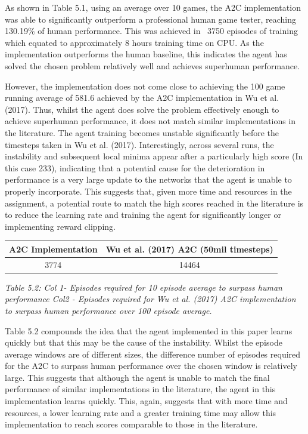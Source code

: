 \documentclass{article}
\begin{document}
As shown in Table 5.1, using an average over 10 games, the A2C implementation was able to significantly outperform a professional human game tester, reaching 130.19\% of human performance. This was achieved in ~3750 episodes of training which equated to approximately 8 hours training time on CPU. As the implementation outperforms the human baseline, this indicates the agent has solved the chosen problem relatively well and achieves superhuman performance. 

However, the implementation does not come close to achieving the 100 game running average of 581.6 achieved by the A2C implementation in Wu et al. (2017). Thus, whilst the agent does solve the problem effectively enough to achieve superhuman performance, it does not match similar implementations in the literature. The agent training becomes unstable significantly before the timesteps taken in Wu et al. (2017). Interestingly, across several runs, the instability and subsequent local minima appear after a particularly high score (In this case 233), indicating that a potential cause for the deterioration in performance is a very large update to the networks that the agent is unable to properly incorporate. This suggests that, given more time and resources in the assignment, a potential route to match the high scores reached in the literature is to reduce the learning rate and training the agent for significantly longer or implementing reward clipping.

\begin{table}[h!]
\centering
\begin{tabular}{|c | c|} 
 \hline
 A2C Implementation & Wu et al. (2017) A2C (50mil timesteps) \\ [0.5ex] 
 \hline
 3774 & 14464   \\ 
 \hline
\end{tabular}
\end{table}
\emph{Table 5.2: Col 1- Episodes required for 10 episode average to surpass human performance Col2 - Episodes required for Wu et al. (2017) A2C implementation to surpass human performance over 100 episode average.}

Table 5.2 compounds the idea that the agent implemented in this paper learns quickly but that this may be the cause of the instability. Whilst the episode average windows are of different sizes, the difference number of episodes required for the A2C to surpass human performance over the chosen window is relatively large. This suggests that although the agent is unable to match the final performance of similar implementations in the literature, the agent in this implementation learns quickly. This, again, suggests that with more time and resources, a lower learning rate and a greater training time may allow this implementation to reach scores comparable to those in the literature.
\end{document}
